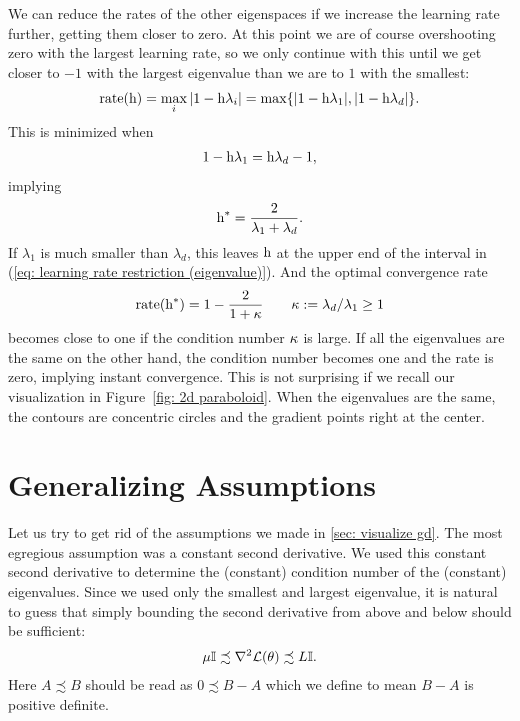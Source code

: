 We can reduce the rates of the other eigenspaces if we
increase the learning rate further, getting them closer to zero. At this point
we are of course overshooting zero with the largest learning rate, so we only
continue with this until we get closer to \(-1\) with the largest eigenvalue
than we are to \(1\) with the smallest:
%
\begin{align*}
	\text{rate}(\text{h})=\max_{i} |1-\text{h}\lambda_i| = \max\{|1-\text{h}\lambda_1|, |1-\text{h}\lambda_d|\}.
\end{align*}
%
This is minimized when
%
\begin{align*}
	1-\text{h}\lambda_1 = \text{h}\lambda_d -1,
\end{align*}
%
implying
%
\begin{align}\label{eq: optimal SGD lr eigenvalue representation}
	\text{h}^* = \frac{2}{\lambda_1 + \lambda_d}.
\end{align}
%
If \(\lambda_1\) is much smaller than \(\lambda_d\), this leaves \(\text{h}\)
at the upper end of the interval in (\ref{eq: learning rate restriction
(eigenvalue)}). And the optimal convergence rate
%
\begin{align*}
	\text{rate}(\text{h}^*)
	= 1 - \frac{2}{1+\kappa}
	\qquad \kappa:=\lambda_d/\lambda_1 \ge 1
\end{align*}
%
becomes close to one if the condition number \(\kappa\) is large.
If all the eigenvalues are the same on the other hand, the condition number
becomes one and the rate is zero, implying instant convergence. This is not
surprising if we recall our visualization in Figure~\ref{fig: 2d paraboloid}.
When the eigenvalues are the same, the contours are concentric circles and the
gradient points right at the center.


\section{Generalizing Assumptions}

Let us try to get rid of the assumptions we made in \ref{sec: visualize gd}.
The most egregious assumption was a constant second derivative. We used this
constant second derivative to determine the (constant) condition number of
the (constant) eigenvalues. Since we used only the smallest and largest
eigenvalue, it is natural to guess that simply bounding the second derivative
from above and below should be sufficient:
%
\begin{align*}
	\mu \mathbb{I} \precsim \nabla^2 \mathcal{L}(\theta) \precsim L \mathbb{I}.
\end{align*}
%
Here \(A \precsim B\) should be read as \(0\precsim B-A\) which we define to mean
\(B-A\) is positive definite.

